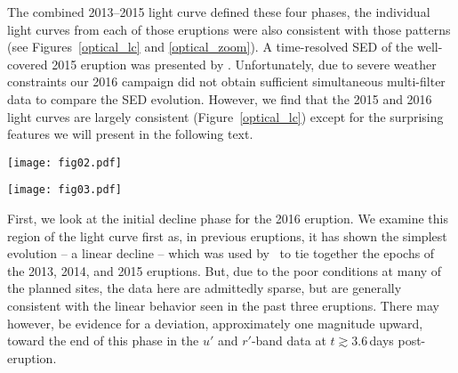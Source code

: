 \documentclass[twocolumn,tighten]{aastex6}
\def\novak{{M31N\,2008-12a}}
\newcommand{\oonek}{\citetalias{2014A&A...563L...9D}}
\newcommand{\ponek}{\citetalias{2014ApJ...786...61T}}
\newcommand{\otwok}{\citetalias{2015A&A...580A..45D}}
\newcommand{\othreek}{\citetalias{2016ApJ...833..149D}}
\begin{document}
The combined 2013--2015 light curve defined these four phases, the individual light curves from each of those eruptions were also consistent with those patterns (see Figures~\ref{optical_lc} and \ref{optical_zoom}). A time-resolved SED of the well-covered 2015 eruption was presented by \othreek. Unfortunately, due to severe weather constraints our 2016 campaign did not obtain sufficient simultaneous multi-filter data to compare the SED evolution. However, we find that the 2015 and 2016 light curves are largely consistent (Figure~\ref{optical_lc}) except for the surprising features we will present in the following text.

\begin{figure*}
\texttt{[image: fig02.pdf]}
\caption{Visible photometry of the past four eruptions of \novak. Black points show the 2016 data (see Table~\ref{optical_photometry_table}). The red points indicate combined data from the 2013--2015 eruptions (\oonek, \otwok, \othreek, and \ponek). We show the SSS turn-on/off times of the \textit{2015} eruption as vertical gray lines, with their uncertainties marked by the shaded areas. For the 2013--2015 light curves combined, the inclined gray lines indicate an exponential decay in luminosity during the range of $1\leq\Delta t\leq4$ days (\othreek).\label{optical_lc}}
\end{figure*}

\begin{figure*}
\texttt{[image: fig03.pdf]}
\caption{As Figure~\ref{optical_lc}, but focusing on $0\leq t\leq4$\,days. The $i'$-band data are excluded as there were no discrepancies between the very limited 2016 $i'$ dataset and the extensive dataset from 2013--2015, $g'$-band data were excluded as no pre-2016 data exist.\label{optical_zoom}}
\end{figure*}

First, we look at the initial decline phase for the 2016 eruption.  We examine this region of the light curve first as, in previous eruptions, it has shown the simplest evolution -- a linear decline -- which was used by \othreek\ to tie together the epochs of the 2013, 2014, and 2015 eruptions.  But, due to the poor conditions at many of the planned sites, the data here are admittedly sparse, but are generally consistent with the linear behavior seen in the past three eruptions.  There may however, be evidence for a deviation, approximately one magnitude upward, toward the end of this phase in the $u'$ and $r'$-band data at $t\gtrsim3.6$\,days post-eruption.
\end{document}
